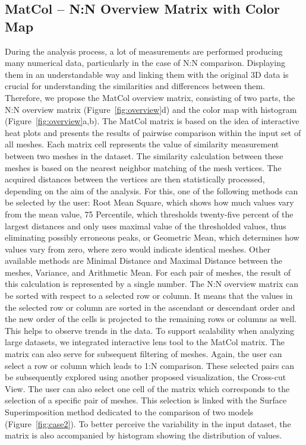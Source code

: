 \documentclass[final,5p,times]{elsarticle}
\begin{document}
\subsection{MatCol -- N:N Overview Matrix with Color Map}
During the analysis process, a lot of measurements are performed producing many numerical data, particularly in the case of N:N comparison.
Displaying them in an understandable way and linking them with the original 3D data is crucial for understanding the similarities and differences between them.
Therefore, we propose the MatCol overview matrix, consisting of two parts, the N:N overview matrix (Figure~\ref{fig:overview}d) and the color map with histogram (Figure~\ref{fig:overview}a,b). 
The MatCol matrix is based on the idea of interactive heat plots and presents the results of pairwise comparison within the input set of all meshes.
Each matrix cell represents the value of similarity measurement between two meshes in the dataset.
The similarity calculation between these meshes is based on the nearest neighbor matching of the mesh vertices.
The acquired distances between the vertices are then statistically processed, depending on the aim of the analysis.
For this, one of the following methods can be selected by the user: Root Mean Square, which shows how much values vary from the mean value, 75 Percentile, which thresholds twenty-five percent of the largest distances and only uses maximal value of the thresholded values, thus eliminating possibly erroneous peaks, or Geometric Mean, which determines how values vary from zero, where zero would indicate identical meshes. 
Other available methods are Minimal Distance and Maximal Distance between the meshes, Variance, and Arithmetic Mean.
For each pair of meshes, the result of this calculation is represented by a single number.
The N:N overview matrix can be sorted with respect to a selected row or column.
It means that the values in the selected row or column are sorted in the ascendant or descendant order and the new order of the cells is projected to the remaining rows or columns as well.
This helps to observe trends in the data.
To support scalability when analyzing large datasets, we integrated interactive lens tool to the MatCol matrix.
The matrix can also serve for subsequent filtering of meshes.
Again, the user can select a row or column which leads to 1:N comparison.
These selected pairs can be subsequently explored using another proposed visualization, the Cross-cut View.
The user can also select one cell of the matrix which corresponds to the selection of a specific pair of meshes.
This selection is linked with the Surface Superimposition method dedicated to the comparison of two models (Figure~\ref{fig:case2}).
To better perceive the variability in the input dataset, the matrix is also accompanied by histogram showing the distribution of values.
\end{document}
